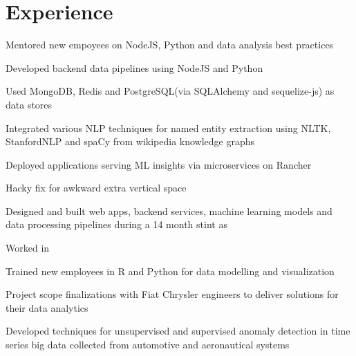 \documentclass[]{deedy-resume-openfont}
\begin{document}
\begin{minipage}[t]{0.64\textwidth}


\section{Experience}

\vspace{\topsep} %
\begin{tightemize}
\item Mentored new empoyees on NodeJS, Python and data analysis best practices
\item Developed backend data pipelines using NodeJS and Python
\item Used MongoDB, Redis and PostgreSQL(via SQLAlchemy and sequelize-js) as data stores
\item Integrated various NLP techniques for named entity extraction using NLTK,
  StanfordNLP and spaCy from wikipedia knowledge graphs
\item Deployed applications serving ML insights via microservices on Rancher
\end{tightemize}
\sectionsep

\vspace{\topsep} Hacky fix for awkward extra vertical space
\begin{tightemize}
\item Designed and built web apps, backend services, machine learning models and data
  processing pipelines during a 14 month stint as 
\item Worked in 
\item Trained new employees in R and Python for data modelling and visualization
\item Project scope finalizations with Fiat Chrysler engineers to deliver solutions for their data analytics
\end{tightemize}
\sectionsep

\begin{tightemize}
\item Developed techniques for unsupervised and supervised anomaly detection in
  time series big data collected from automotive and aeronautical systems
\end{tightemize}
\sectionsep


\end{minipage}
\end{document}
